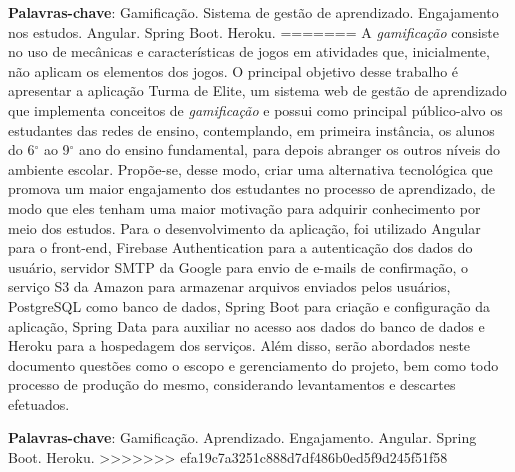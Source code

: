 \begin{resumo}
 \textbf{Palavras-chave}: Gamificação. Sistema de gestão de aprendizado. Engajamento nos estudos. Angular. Spring Boot. Heroku.
=======
 A \textit{gamificação} consiste no uso de mecânicas e características de jogos em atividades que, inicialmente, não aplicam os elementos dos jogos. O principal objetivo desse trabalho é apresentar a aplicação Turma de Elite, um sistema web de gestão de aprendizado que implementa conceitos de \textit{gamificação} e possui como principal público-alvo os estudantes das redes de ensino, contemplando, em primeira instância, os alunos do 6$^\circ$ ao 9$^\circ$ ano do ensino fundamental, para depois abranger os outros níveis do ambiente escolar. Propõe-se, desse modo, criar uma alternativa tecnológica que promova um maior engajamento dos estudantes no processo de aprendizado, de modo que eles tenham uma maior motivação para adquirir conhecimento por meio dos estudos. Para o desenvolvimento da aplicação, foi utilizado Angular para o front-end, Firebase Authentication para a autenticação dos dados do usuário, servidor SMTP da Google para envio de e-mails de confirmação, o serviço S3 da Amazon para armazenar arquivos enviados pelos usuários, PostgreSQL como banco de dados, Spring Boot para criação e configuração da aplicação, Spring Data para auxiliar no acesso aos dados do banco de dados e Heroku para a hospedagem dos serviços. Além disso, serão abordados neste documento questões como o escopo e gerenciamento do projeto, bem como todo processo de produção do mesmo, considerando levantamentos e descartes efetuados. 
 
 
 \vspace{\onelineskip}
 
 \textbf{Palavras-chave}: Gamificação. Aprendizado. Engajamento. Angular. Spring Boot. Heroku.
>>>>>>> efa19c7a3251c888d7df486b0ed5f9d245f51f58
 
\end{resumo}

